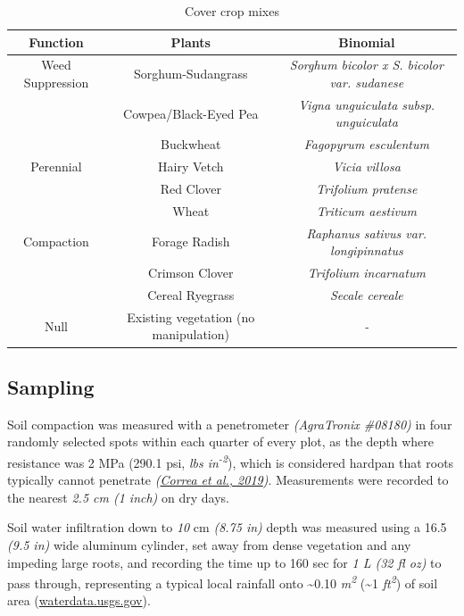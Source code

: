 \documentclass[
  12pt,
]{article}
\begin{document}
\begin{table}

\caption{\label{tab:setupM}Cover crop mixes}
\centering
\begin{tabular}[t]{c|c|>{}c}
\hline
\textbf{Function} & \textbf{Plants} & \textbf{Binomial}\\
\hline
Weed Suppression & Sorghum-Sudangrass & \em{Sorghum bicolor x S. bicolor var. sudanese}\\
\hline
 & Cowpea/Black-Eyed Pea & \em{Vigna unguiculata subsp. unguiculata}\\
\hline
 & Buckwheat & \em{Fagopyrum esculentum}\\
\hline
Perennial & Hairy Vetch & \em{Vicia villosa}\\
\hline
 & Red Clover & \em{Trifolium pratense}\\
\hline
 & Wheat & \em{Triticum aestivum}\\
\hline
Compaction & Forage Radish & \em{Raphanus sativus var. longipinnatus}\\
\hline
 & Crimson Clover & \em{Trifolium incarnatum}\\
\hline
 & Cereal Ryegrass & \em{Secale cereale}\\
\hline
Null & Existing vegetation (no manipulation) & \em{-}\\
\hline
\end{tabular}
\end{table}

\hypertarget{sampling}{%
\subsection{Sampling}\label{sampling}}

Soil compaction was measured with a penetrometer \emph{(AgraTronix \#08180)} in four randomly selected spots within each quarter of every plot, as the depth where resistance was 2 MPa (290.1 psi, \emph{lbs in\textsuperscript{-2}}), which is considered hardpan that roots typically cannot penetrate \emph{(\protect\hyperlink{ref-correa19}{Correa et al., 2019})}.
Measurements were recorded to the nearest \emph{2.5 cm (1 inch)} on dry days.

Soil water infiltration down to \emph{10}
cm \emph{(8.75 in)} depth was measured using a 16.5 \emph{(9.5 in)} wide aluminum cylinder, set away from dense vegetation and any impeding large roots, and recording the time up to 160 sec for \emph{1 L (32 fl oz)} to pass through, representing a typical local rainfall onto \textasciitilde0.10 \emph{m\textsuperscript{2}} (\textasciitilde1 \emph{ft\textsuperscript{2}}) of soil area (\url{waterdata.usgs.gov}).
\end{document}
